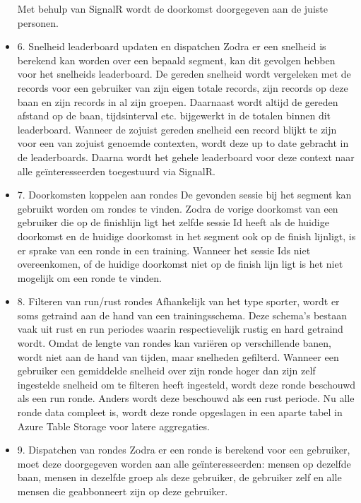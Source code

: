 \begin{itemize}
Met behulp van SignalR wordt de doorkomst doorgegeven aan de juiste personen.

\item 6. Snelheid leaderboard updaten en dispatchen
Zodra er een snelheid is berekend kan worden over een bepaald segment, kan dit gevolgen hebben voor het snelheids leaderboard. De gereden snelheid wordt vergeleken met de records voor een gebruiker van zijn eigen totale records, zijn records op deze baan en zijn records in al zijn groepen. Daarnaast wordt altijd de gereden afstand op de baan, tijdsinterval etc. bijgewerkt in de totalen binnen dit leaderboard. Wanneer de zojuist gereden snelheid een record blijkt te zijn voor een van zojuist genoemde contexten, wordt deze up to date gebracht in de leaderboards. Daarna wordt het gehele leaderboard voor deze context naar alle geïnteresseerden toegestuurd via SignalR.

\item 7. Doorkomsten koppelen aan rondes
De gevonden sessie bij het segment kan gebruikt worden om rondes te vinden. Zodra de vorige doorkomst van een gebruiker die op de finishlijn ligt het zelfde sessie Id heeft als de huidige doorkomst en de huidige doorkomst in het segment ook op de finish lijnligt, is er sprake van een ronde in een training. 
Wanneer het sessie Ids niet overeenkomen, of de huidige doorkomst niet op de finish lijn ligt is het niet mogelijk om een ronde te vinden.

\item 8. Filteren van run/rust rondes
Afhankelijk van het type sporter, wordt er soms getraind aan de hand van een trainingsschema. Deze schema's bestaan vaak uit rust en run periodes waarin respectievelijk rustig en hard getraind wordt. Omdat de lengte van rondes kan variëren op verschillende banen, wordt niet aan de hand van tijden, maar snelheden gefilterd. Wanneer een gebruiker een gemiddelde snelheid over zijn ronde hoger dan zijn zelf ingestelde snelheid om te filteren heeft ingesteld, wordt deze ronde beschouwd als een run ronde. Anders wordt deze beschouwd als een rust periode. Nu alle ronde data compleet is, wordt deze ronde opgeslagen in een aparte tabel in Azure Table Storage voor latere aggregaties.

\item 9. Dispatchen van rondes
Zodra er een ronde is berekend voor een gebruiker, moet deze doorgegeven worden aan alle geïnteresseerden: mensen op dezelfde baan, mensen in dezelfde groep als deze gebruiker, de gebruiker zelf en alle mensen die geabbonneert zijn op deze gebruiker.


\end{itemize}
